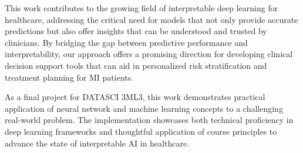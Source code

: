 \documentclass[oupdraft]{bio}
\begin{document}
This work contributes to the growing field of interpretable deep learning for healthcare, addressing the critical need for models that not only provide accurate predictions but also offer insights that can be understood and trusted by clinicians. By bridging the gap between predictive performance and interpretability, our approach offers a promising direction for developing clinical decision support tools that can aid in personalized risk stratification and treatment planning for MI patients.

As a final project for DATASCI 3ML3, this work demonstrates practical application of neural network and machine learning concepts to a challenging real-world problem. The implementation showcases both technical proficiency in deep learning frameworks and thoughtful application of course principles to advance the state of interpretable AI in healthcare.




\end{document}
